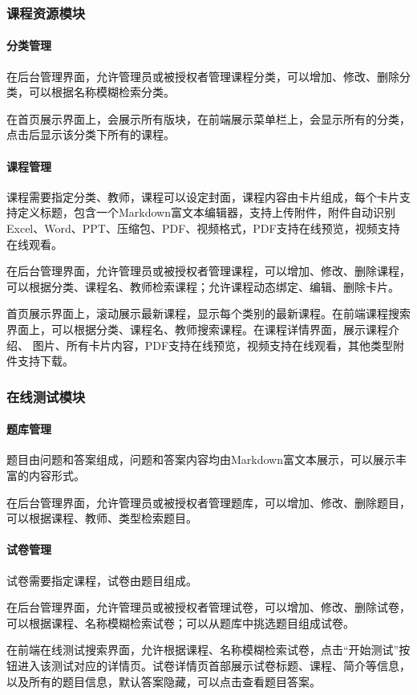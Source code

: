 \documentclass[titlepage,UTF8,linespread=1.5]{ctexart}
\begin{document}
\subsubsection{课程资源模块}
\paragraph{分类管理}
在后台管理界面，允许管理员或被授权者管理课程分类，可以增加、修改、删除分类，可以根据名称模糊检索分类。\par
在首页展示界面上，会展示所有版块，在前端展示菜单栏上，会显示所有的分类，点击后显示该分类下所有的课程。\par
\paragraph{课程管理}
课程需要指定分类、教师，课程可以设定封面，课程内容由卡片组成，每个卡片支持定义标题，包含一个Markdown富文本编辑器，支持上传附件，附件自动识别
Excel、Word、PPT、压缩包、PDF、视频格式，PDF支持在线预览，视频支持在线观看。\par
在后台管理界面，允许管理员或被授权者管理课程，可以增加、修改、删除课程，可以根据分类、课程名、教师检索课程；允许课程动态绑定、编辑、删除卡片。\par
首页展示界面上，滚动展示最新课程，显示每个类别的最新课程。在前端课程搜索界面上，可以根据分类、课程名、教师搜索课程。在课程详情界面，展示课程介绍、
图片、所有卡片内容，PDF支持在线预览，视频支持在线观看，其他类型附件支持下载。\par

\subsubsection{在线测试模块}
\paragraph{题库管理}
题目由问题和答案组成，问题和答案内容均由Markdown富文本展示，可以展示丰富的内容形式。\par
在后台管理界面，允许管理员或被授权者管理题库，可以增加、修改、删除题目，可以根据课程、教师、类型检索题目。\par

\paragraph{试卷管理}
试卷需要指定课程，试卷由题目组成。\par
在后台管理界面，允许管理员或被授权者管理试卷，可以增加、修改、删除试卷，可以根据课程、名称模糊检索试卷；可以从题库中挑选题目组成试卷。\par
在前端在线测试搜索界面，允许根据课程、名称模糊检索试卷，点击“开始测试”按钮进入该测试对应的详情页。试卷详情页首部展示试卷标题、课程、简介等信息，
以及所有的题目信息，默认答案隐藏，可以点击查看题目答案。\par
\end{document}
